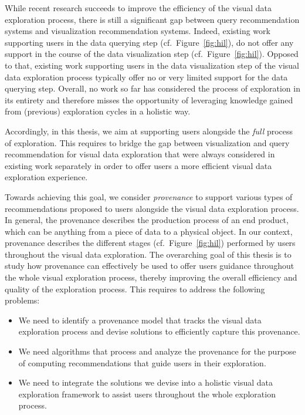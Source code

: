 While recent research succeeds to improve the efficiency of the visual data exploration process, there is still a significant gap between query recommendation systems and visualization recommendation systems.
Indeed, existing work supporting users in the data querying step (cf.~Figure~\ref{fig:hil}), do not offer any support in the course of the data visualization step (cf.~Figure~\ref{fig:hil}). Opposed to that, existing work supporting users in the data visualization step of the visual data exploration process typically offer no or very limited support for the data querying step. 
Overall, no work so far has considered the process of exploration in its entirety and therefore misses the opportunity of leveraging knowledge gained from (previous) exploration cycles in a holistic way.




Accordingly, in this thesis, we aim at supporting users alongside the \emph{full} process of exploration. This requires to bridge the gap between visualization and query recommendation for visual data exploration that were always considered in existing work separately in order to offer users a more efficient visual data exploration experience. 

Towards achieving this goal, we consider \emph{provenance} to support various types of recommendations  proposed to users alongside the visual data exploration process.
In general, the provenance describes the production process of an end product, which can be anything from a piece of data to a physical object. 
In our context, provenance describes the different stages (cf.~Figure~\ref{fig:hil}) performed by users throughout the visual data exploration. The overarching goal of this thesis is to study how provenance can effectively be used to offer users guidance throughout the whole visual exploration process, thereby improving the overall efficiency and quality  of the exploration process. This requires to address the following problems:

\begin{itemize}
\item We need to identify a provenance model that tracks the visual data exploration process and devise solutions to efficiently capture this provenance. 
\item We need algorithms that process and analyze the provenance for the purpose of computing recommendations that guide users in their exploration. 
\item We need to integrate the solutions we devise into a holistic visual data exploration framework to assist users throughout the whole exploration process.
\end{itemize}


